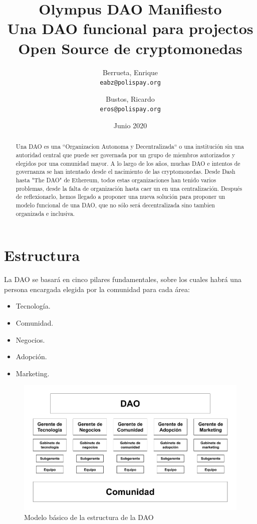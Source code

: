 \documentclass{article}
\title{%
  Olympus DAO Manifiesto \\
  \large Una DAO funcional para projectos Open Source de cryptomonedas }
\author{
  Berrueta, Enrique\\
  \texttt{eabz@polispay.org}
  \and
  Bustos, Ricardo\\
  \texttt{eros@polispay.org}
}
\date{Junio 2020}
\begin{document}
\maketitle

	\begin{abstract}
	Una DAO es una ``Organizacion Autonoma y Decentralizada`` o una institución sin una autoridad central que puede ser governada por un grupo de miembros autorizados y elegidos por una comunidad mayor. A lo largo de los años, muchas DAO e intentos de governanza se han intentado desde el nacimiento de las cryptomonedas. Desde Dash hasta "The DAO" de Ethereum, todos estas organizaciones han tenido varios problemas, desde la falta de organización hasta caer un en una centralización. Después de reflexionarlo, hemos llegado a proponer una nueva solución para proponer un modelo funcional de una DAO, que no sólo será decentralizada sino tambien organizada e inclusiva.
	\end{abstract}

\newpage

\tableofcontents


\newpage

\section{Estructura}

La DAO se basará en cinco pilares fundamentales, sobre los cuales habrá una persona encargada elegida por la comunidad para cada área:

\begin{itemize}
  \item Tecnología.
  \item Comunidad.
  \item Negocios.
  \item Adopción.
  \item Marketing.
\end{itemize}

\begin{figure}[h]
\includegraphics[scale=0.4]{img/dao_structure_es.png}
\centering
\caption{Modelo básico de la estructura de la DAO}
\end{figure}
\end{document}
